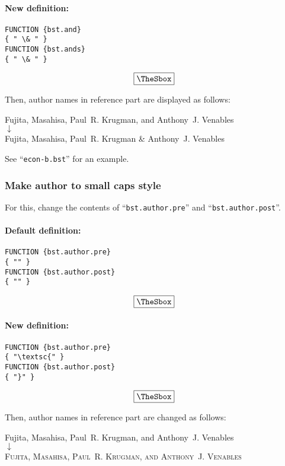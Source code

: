 \documentclass[10pt]{article}
\newenvironment{Frame}%
{\setlength{\fboxsep}{15pt}
\setlength{\mylength}{\linewidth}%
\addtolength{\mylength}{-2\fboxsep}%
\addtolength{\mylength}{-2\fboxrule}%
\Sbox
\minipage{\mylength}%
\setlength{\abovedisplayskip}{0pt}%
\setlength{\belowdisplayskip}{0pt}%
}%
{\endminipage\endSbox
\[\fbox{\TheSbox}\]}
\begin{document}
\paragraph{New definition:}
\begin{Frame}
\begin{verbatim}
FUNCTION {bst.and}
{ " \& " }
FUNCTION {bst.ands}
{ " \& " }
\end{verbatim}
\end{Frame}

Then, author names in reference part are displayed as follows:
\begin{center}
Fujita, Masahisa, Paul~R. Krugman, and Anthony~J. Venables \\
 $\downarrow$ \\
Fujita, Masahisa, Paul~R. Krugman \& Anthony~J. Venables 
\end{center}

See ``\texttt{econ-b.bst}'' for an example.

\subsubsection{Make author to small caps style}

For this, change the contents of ``\texttt{bst.author.pre}'' and ``\texttt{bst.author.post}''.
\paragraph{Default definition:}
\begin{Frame}
\begin{verbatim}
FUNCTION {bst.author.pre}
{ "" }
FUNCTION {bst.author.post}
{ "" }
\end{verbatim}
\end{Frame}

\paragraph{New definition:}
\begin{Frame}
\begin{verbatim}
FUNCTION {bst.author.pre}
{ "\textsc{" }
FUNCTION {bst.author.post}
{ "}" }
\end{verbatim}
\end{Frame}

Then, author names in reference part are changed as follows:
\begin{center}
Fujita, Masahisa, Paul~R. Krugman, and Anthony~J. Venables \\
 $\downarrow$ \\
\textsc{Fujita, Masahisa, Paul~R. Krugman, and Anthony~J. Venables}
\end{center}
\end{document}
